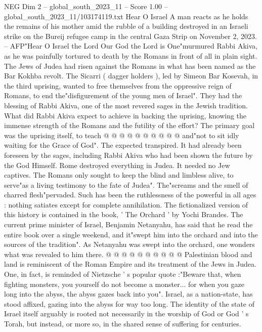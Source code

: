 \begin{textsample}{NEG Dim 2 – global\_south\_2023\_11 – Score 1.00 – global\_south\_2023\_11/103174119.txt}  \label{ex:f2_neg_228}
Hear O Israel A man reacts as he holds the remains of his mother amid the rubble of a building destroyed in an Israeli strike on the Bureij refugee camp in the central Gaza Strip on November 2, 2023. -- AFP"Hear O Israel the Lord Our God the Lord is One"murmured Rabbi Akiva, as he was painfully tortured to death by the Romans in front of all in plain sight.
The Jews of Judea had risen against the Romans in what has been named as the Bar Kokhba revolt.
The Sicarri ( dagger holders ), led by Simeon Bar Kosevah, in the third uprising, wanted to free themselves from the oppressive reign of Romans, to end the"disfigurement of the young men of Israel".
They had the blessing of Rabbi Akiva, one of the most revered sages in the Jewish tradition.
What did Rabbi Akiva expect to achieve in backing the uprising, knowing the immense strength of the Romans and the futility of the effort?
The primary goal was the uprising itself, to teach @ @ @ @ @ @ @ @ @ @ and"not to sit idly waiting for the Grace of God".
The expected transpired.
It had already been foreseen by the sages, including Rabbi Akiva who had been shown the future by the God Himself.
Rome destroyed everything in Judea.
It needed no Jew captives.
The Romans only sought to keep the blind and limbless alive, to serve"as a living testimony to the fate of Judea".
The"screams and the smell of charred flesh"pervaded.
Such has been the ruthlessness of the powerful in all ages : nothing satiates except for complete annihilation.
The fictionalized version of this history is contained in the book, ' The Orchard ' by Yochi Brandes.
The current prime minister of Israel, Benjamin Netanyahu, has said that he read the entire book over a single weekend, and it"swept him into the orchard and into the sources of the tradition".
As Netanyahu was swept into the orchard, one wonders what was revealed to him there. @ @ @ @ @ @ @ @ @ @ Palestinian blood and land is reminiscent of the Roman Empire and its treatment of the Jews in Judea.
One, in fact, is reminded of Nietzsche ' s popular quote :"Beware that, when fighting monsters, you yourself do not become a monster... for when you gaze long into the abyss, the abyss gazes back into you".
Israel, as a nation-state, has stood affixed, gazing into the abyss for way too long.
The identity of the state of Israel itself arguably is rooted not necessarily in the worship of God or God ' s Torah, but instead, or more so, in the shared sense of suffering for centuries.

\end{textsample}
